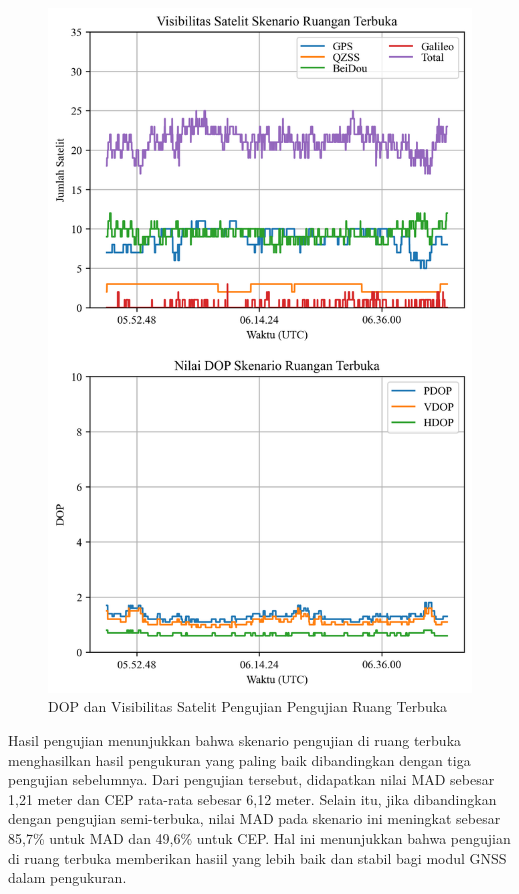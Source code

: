 \begin{figure}[H]
	\centering
	\includegraphics[width=12cm]{contents/chapter-4/4-skenario-outdoor/sats_dop.png}
	\caption{DOP dan Visibilitas Satelit Pengujian Pengujian Ruang Terbuka}
	\label{Fig: outdoor-dop_sats}
\end{figure}

Hasil pengujian menunjukkan bahwa skenario pengujian di ruang terbuka menghasilkan hasil pengukuran yang paling baik dibandingkan dengan tiga pengujian sebelumnya. Dari pengujian tersebut, didapatkan nilai MAD sebesar 1,21 meter dan CEP rata-rata sebesar 6,12 meter. Selain itu, jika dibandingkan dengan pengujian semi-terbuka, nilai MAD pada skenario ini meningkat sebesar 85,7\% untuk MAD dan 49,6\% untuk CEP. Hal ini menunjukkan bahwa pengujian di ruang terbuka memberikan hasiil yang lebih baik dan stabil bagi modul GNSS dalam pengukuran. 

